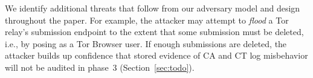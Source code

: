 %
%
We identify additional threats that follow from our adversary model and
design throughout the paper.  For example, the attacker may attempt to
\emph{flood} a Tor relay's submission endpoint to the extent that some
submission must be deleted, i.e., by posing as a Tor Browser user.  If enough
submissions are deleted, the attacker builds up confidence that stored evidence
of CA and CT log misbehavior will not be audited in phase~3
(Section~\ref{sec:todo}).

